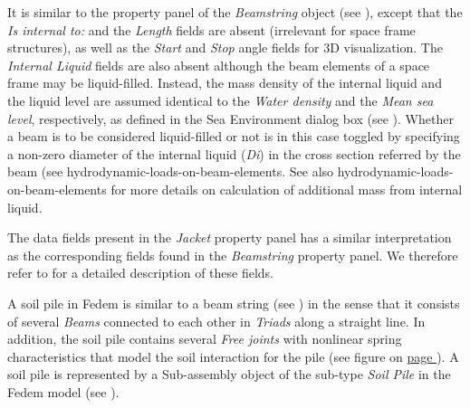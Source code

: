 It is similar to the property panel of the {\sl Beamstring} object
(see ),
except that the {\sl Is internal to:} and the {\sl Length} fields are absent
(irrelevant for space frame structures), as well as the {\sl Start} and
{\sl Stop} angle fields for 3D visualization.
The {\sl Internal Liquid} fields are also absent although the beam elements of
a space frame may be liquid-filled.
Instead, the mass density of the internal liquid and the liquid level are
assumed identical to the {\sl Water density} and the {\sl Mean sea level},
respectively, as defined in the Sea Environment dialog box
(see ).
Whether a beam is to be considered liquid-filled or not is in this case toggled
by specifying a non-zero diameter of the internal liquid ({\sl Di})
in the cross section referred by the beam
(see 
{hydrodynamic-loads-on-beam-elements}.
See also 
{hydrodynamic-loads-on-beam-elements} for more details on calculation
of additional mass from internal liquid.

The data fields present in the {\sl Jacket} property panel has a similar
interpretation as the corresponding fields found in the {\sl Beamstring}
property panel. We therefore refer to
for a detailed description of these fields.



A soil pile in Fedem is similar to a beam string
(see )
in the sense that it consists of several {\sl Beams} connected to each other in
{\sl Triads} along a straight line. In addition, the soil pile contains several
{\sl Free joints} with nonlinear spring characteristics that model the soil
interaction for the pile
(see figure on \hyperref[soil-springs]{page }). A soil pile
is represented by a Sub-assembly object of the sub-type {\sl Soil Pile}
in the Fedem model (see ).





